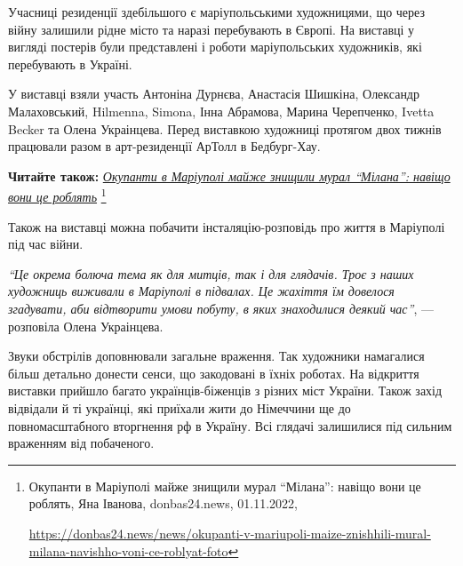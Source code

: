

Учасниці резиденції здебільшого є маріупольськими художницями, що через війну
залишили рідне місто та наразі перебувають в Європі. На виставці у вигляді
постерів були представлені і роботи маріупольських художників, які перебувають
в Україні.

У виставці взяли участь Антоніна Дурнєва, Анастасія Шишкіна, Олександр
Малаховський, Hilmenna, Simona, Інна Абрамова, Марина Черепченко, Ivetta Becker
та Олена Украінцева. Перед виставкою художниці протягом двох тижнів працювали
разом в арт-резиденції АрТолл в Бедбург-Хау.


\textbf{Читайте також:} \href{https://donbas24.news/news/okupanti-v-mariupoli-maize-znishhili-mural-milana-navishho-voni-ce-roblyat-foto}{\emph{Окупанти в Маріуполі майже знищили мурал \enquote{Мілана}: навіщо вони це роблять}}%
\footnote{Окупанти в Маріуполі майже знищили мурал \enquote{Мілана}: навіщо вони це роблять, Яна Іванова, donbas24.news, 01.11.2022, \par%
\url{https://donbas24.news/news/okupanti-v-mariupoli-maize-znishhili-mural-milana-navishho-voni-ce-roblyat-foto}%
}


Також на виставці можна побачити інсталяцію-розповідь про життя в Маріуполі під
час війни.

\begin{leftbar}
\emph{\enquote{Це окрема болюча тема як для митців, так і для глядачів. Троє з наших
художниць виживали в Маріуполі в підвалах. Це жахіття їм довелося
згадувати, аби відтворити умови побуту, в яких знаходилися деякий час}},
— розповіла Олена Украінцева.
\end{leftbar}

Звуки обстрілів доповнювали загальне враження. Так художники намагалися більш
детально донести сенси, що закодовані в їхніх роботах. На відкриття виставки
прийшло багато українців-біженців з різних міст України. Також захід відвідали
й ті українці, які приїхали жити до Німеччини ще до повномасштабного вторгнення
рф в Україну. Всі глядачі залишилися під сильним враженням від побаченого.

